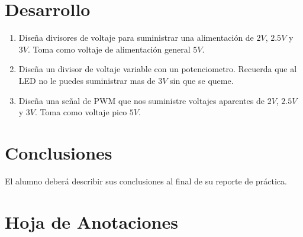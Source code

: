 
\section{Desarrollo}

	\begin{enumerate}
		\item Diseña divisores de voltaje para suministrar una alimentación de $2 V$, $2.5 V$ y $3 V$. Toma como voltaje de alimentación general $5 V$.
		\item Diseña un divisor de voltaje variable con un potenciometro. Recuerda que al LED no le puedes suministrar mas de $3 V$ sin que se queme.
		\item Diseña una señal de PWM que nos suministre voltajes aparentes de $2 V$, $2.5 V$ y $3 V$. Toma como voltaje pico $5 V$.
	\end{enumerate}



\section{Conclusiones}

	El alumno deberá describir sus conclusiones al final de su reporte de práctica.


\clearpage
\section{Hoja de Anotaciones}

